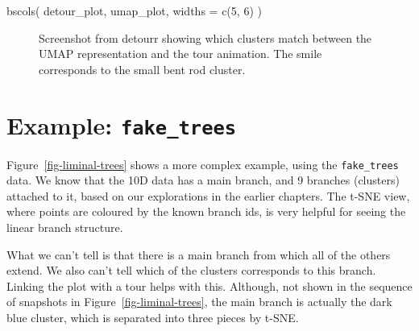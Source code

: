\documentclass[
  letterpaper,
]{krantz}
\newenvironment{Shaded}{\begin{snugshade}}{\end{snugshade}}
\newcommand{\AttributeTok}[1]{\textcolor[rgb]{0.40,0.45,0.13}{#1}}
\newcommand{\DecValTok}[1]{\textcolor[rgb]{0.68,0.00,0.00}{#1}}
\newcommand{\FunctionTok}[1]{\textcolor[rgb]{0.28,0.35,0.67}{#1}}
\newcommand{\NormalTok}[1]{\textcolor[rgb]{0.00,0.23,0.31}{#1}}
\begin{document}
\begin{Shaded}
\begin{Highlighting}[]
\FunctionTok{bscols}\NormalTok{(}
\NormalTok{     detour\_plot, umap\_plot,}
     \AttributeTok{widths =} \FunctionTok{c}\NormalTok{(}\DecValTok{5}\NormalTok{, }\DecValTok{6}\NormalTok{)}
\NormalTok{ )}
\end{Highlighting}
\end{Shaded}

\begin{figure}


\caption{\label{fig-detourr-clusters-nonlin}Screenshot from detourr
showing which clusters match between the UMAP representation and the
tour animation. The smile corresponds to the small bent rod cluster.}

\end{figure}%

\section{\texorpdfstring{Example:
\texttt{fake\_trees}}{Example: fake\_trees}}\label{example-fake_trees}


Figure~\ref{fig-liminal-trees} shows a more complex example, using the
\texttt{fake\_trees} data. We know that the 10D data has a main branch,
and 9 branches (clusters) attached to it, based on our explorations in
the earlier chapters. The t-SNE view, where points are coloured by the
known branch ids, is very helpful for seeing the linear branch
structure.

What we can't tell is that there is a main branch from which all of the
others extend. We also can't tell which of the clusters corresponds to
this branch. Linking the plot with a tour helps with this. Although, not
shown in the sequence of snapshots in Figure~\ref{fig-liminal-trees},
the main branch is actually the dark blue cluster, which is separated
into three pieces by t-SNE.
\end{document}
